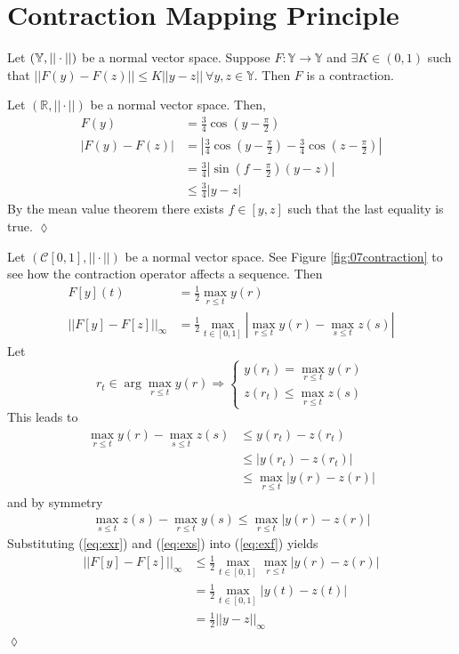 \documentclass[lecture,12pt,]{pcms-l}
\begin{document}
\section{Contraction Mapping Principle}
\begin{definition}
Let $(\mathbb{Y},||\cdot||)$ be a normal vector space. Suppose $F:\mathbb{Y}\to\mathbb{Y}$ and $\exists K\in(0,1)$ such that $||F(y)-F(z)||\leq K||y-z|| ~\forall y,z\in\mathbb{Y}$. Then $F$ is a contraction.
\end{definition}

\begin{example}
Let $(\mathbb{R},||\cdot||)$ be a normal vector space. Then,
\begin{align*}
F(y) &= \frac{3}{4}\cos(y-\frac{\pi}{2}) \\
|F(y)-F(z)| &= \left|\frac{3}{4}\cos(y-\frac{\pi}{2})-\frac{3}{4}\cos(z-\frac{\pi}{2})\right| \\
&= \frac{3}{4}\left|\sin(f-\frac{\pi}{2})(y-z)\right| \\
&\leq \frac{3}{4}|y-z|
\end{align*}
By the mean value theorem there exists $f\in[y,z]$ such that the last equality is true.
$\lozenge$
\end{example}

\begin{example}
Let $(\mathcal{C}[0,1],||\cdot||)$ be a normal vector space. See Figure \ref{fig:07contraction} to see how the contraction operator affects a sequence. Then
\begin{align}
\label{eq:exf}
F[y](t) &= \frac{1}{2}\max_{r\leq t}y(r) \nonumber \\
||F[y]-F[z]||_\infty &= \frac{1}{2}\max_{t\in[0,1]}|\max_{r\leq t}y(r)-\max_{s\leq t}z(s)|
\end{align}
Let
$$r_t\in\arg\max_{r\leq t}y(r) \Rightarrow \begin{cases} y(r_t) = \max_{r\leq t}y(r) \\ z(r_t)\leq\max_{r\leq t}z(s) \end{cases}$$
This leads to
\begin{align}
\label{eq:exr}
\max_{r\leq t}y(r)-\max_{s\leq t}z(s) &\leq y(r_t)-z(r_t) \nonumber \\
&\leq |y(r_t)-z(r_t)| \nonumber \\
&\leq \max_{r\leq t}|y(r)-z(r)|
\end{align}
and by symmetry
\begin{align}
\label{eq:exs}
\max_{s\leq t}z(s)-\max_{r\leq t}y(s) \leq \max_{r\leq t}|y(r)-z(r)|
\end{align}
Substituting (\ref{eq:exr}) and (\ref{eq:exs}) into (\ref{eq:exf}) yields
\begin{align*}
||F[y]-F[z]||_\infty &\leq \frac{1}{2}\max_{t\in[0,1]}\max_{r\leq t}|y(r)-z(r)| \\
&= \frac{1}{2}\max_{t\in[0,1]}|y(t)-z(t)| \\
&= \frac{1}{2}||y-z||_\infty
\end{align*}
$\lozenge$
\end{example}
\end{document}
